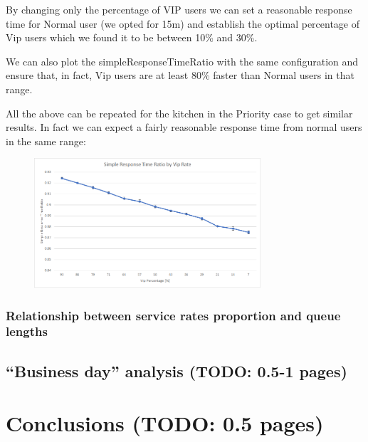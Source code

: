 By changing only the percentage of VIP users we can set a reasonable response time for Normal user (we opted for 15m) and establish the optimal percentage of Vip users which we found it to be between 10\% and 30\%.

We can also plot the simpleResponseTimeRatio with the same configuration and ensure that, in fact, Vip users are at least 80\% faster than Normal users in that range.

All the above can be repeated for the kitchen in the Priority case to get similar results. In fact we can expect a fairly reasonable response time from normal users in the same range:

\begin{figure}[H]
    \centering
    \includegraphics[width=0.75\textwidth]{figs/simpleResponseTimeRatio.png} %
\end{figure}

\subsubsection{Relationship between service rates proportion and queue lengths}
\label{sec:cashier_no_infl}

\subsubsection{}

\subsection{``Business day'' analysis (TODO: 0.5-1 pages)}

\section{Conclusions (TODO: 0.5 pages)}
